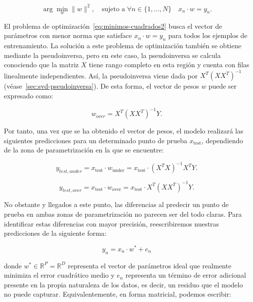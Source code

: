 \begin{equation}\label{eq:minimos-cuadrados2}
    \arg\min_{w}\| w \|^{2}, \quad \text{sujeto a} \; \forall n \in \{1, \ldots, N\} \quad x_n \cdot w = y_n.
\end{equation}\newline

El problema de optimización~\eqref{eq:minimos-cuadrados2} busca el vector de parámetros con menor norma que satisface $x_n \cdot w = y_n$ para todos los ejemplos de entrenamiento. La solución a este problema de optimización también se obtiene mediante la pseudoinversa, pero en este caso, la pseudoinversa se calcula conociendo que la matriz $X$ tiene rango completo en esta región y cuenta con filas linealmente independientes. Así, la pseudoinversa viene dada por $X^{T}{(XX^{T})}^{-1}$ (véase~\ref{sec:svd-pseudoinversa}). De esta forma, el vector de pesos $w$ puede ser expresado como:

\begin{equation}
    w_{over} = X^{T}{(XX^{T})}^{-1}Y.
\end{equation}\newline

Por tanto, una vez que se ha obtenido el vector de pesos, el modelo realizará las siguientes predicciones para un determinado punto de prueba $x_{\text{test}}$, dependiendo de la zona de parametrización en la que se encuentre:

\begin{equation}
    y_{test, under} = x_{\text{test}} \cdot w_{\text{under}} = x_{\text{test}} \cdot {(X^{T}X)}^{-1}X^{T}Y.
\end{equation}

\begin{equation}
    y_{test, over} = x_{\text{test}} \cdot w_{\text{over}} = x_{\text{test}} \cdot X^{T}{(XX^{T})}^{-1}Y.
\end{equation}\newline

No obstante y llegados a este punto, las diferencias al predecir un punto de prueba en ambas zonas de parametrización no parecen ser del todo claras. Para identificar estas diferencias con mayor precisión, reescribiremos nuestras predicciones de la siguiente forma:

\[
    y_n = x_n \cdot w^{*} + e_n
\]

donde $w^{*} \in \mathbb{R}^{P} = \mathbb{R}^{D}$ representa el vector de parámetros ideal que realmente minimiza el error cuadrático medio y $e_n$ representa un término de error adicional presente en la propia naturaleza de los datos, es decir, un residuo que el modelo no puede capturar. Equivalentemente, en forma matricial, podemos escribir:

